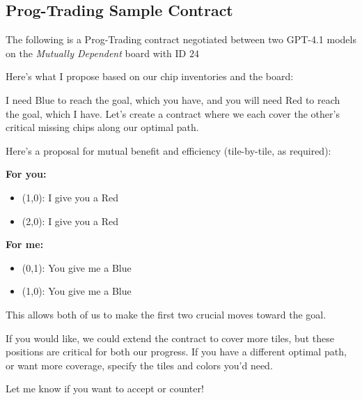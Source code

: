 \documentclass{article} %
\newcommand{\PTC}{Prog-Trading\xspace}
\newcommand{\GPT}{GPT-4.1\xspace}
\begin{document}
\subsection{\PTC Sample Contract}
The following is a \PTC contract negotiated between two \GPT models on the \textit{Mutually Dependent} board with ID $24$
%
\begin{redbox}[P-Red]
Here's what I propose based on our chip inventories and the board:

\vspace{0.5em}

I need Blue to reach the goal, which you have, and you will need Red to reach the goal, which I have. Let's create a contract where we each cover the other's critical missing chips along our optimal path.

\vspace{0.5em}

Here's a proposal for mutual benefit and efficiency (tile-by-tile, as required):

\vspace{0.5em}

\textbf{For you:}
\begin{itemize}
  \item (1,0): I give you a Red
  \item (2,0): I give you a Red
\end{itemize}

\vspace{0.5em}

\textbf{For me:}
\begin{itemize}
  \item (0,1): You give me a Blue
  \item (1,0): You give me a Blue
\end{itemize}

\vspace{0.5em}

This allows both of us to make the first two crucial moves toward the goal.

\vspace{0.5em}

If you would like, we could extend the contract to cover more tiles, but these positions are critical for both our progress. If you have a different optimal path, or want more coverage, specify the tiles and colors you'd need.

\vspace{0.5em}

Let me know if you want to accept or counter!
\end{redbox}
\end{document}
